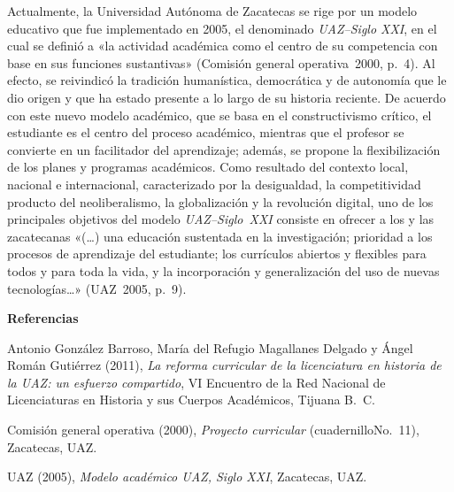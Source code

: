 Actualmente, la Universidad Autónoma de Zacatecas se rige por un modelo educativo que fue implementado en 2005, el de\-no\-mi\-na\-do {\textit{UAZ--Siglo XXI}}, en el cual se definió a «la actividad académica como el centro de su 
competencia con base en sus funciones sustantivas» (Comisión general 
operativa~2000, p.~4).  Al efecto, se reivindicó la tradición 
humanística, democrática y de autonomía que le dio origen y que ha 
estado presente a lo largo de su historia reciente. De acuerdo con este 
nuevo modelo académico, que se basa en el constructivismo crítico, el 
estudiante es el centro del proceso académico, mientras que el profesor 
se convierte en un facilitador del aprendizaje; además, se propone la 
flexibilización de los planes y programas académicos. Como resultado 
del contexto local, nacional e internacional, caracterizado por la 
desigualdad, la competitividad producto del neoliberalismo, la 
globalización y la revolución digital, uno de los principales objetivos 
del modelo \textit{UAZ--Siglo~XXI} consiste en ofrecer a los y las 
zacatecanas «(\ldots) una educación sustentada en la investigación; prioridad a 
los procesos de aprendizaje del estudiante; los currículos abiertos y 
flexibles para todos y para toda la vida, y la incorporación y 
generalización del uso de nuevas tecnologías\ldots» (UAZ~2005, p.~9).

\bigskip
\textbf{Referencias}

Antonio González Barroso, María del Refugio Magallanes Delgado y Ángel
Román Gutiérrez (2011), \textit{La reforma curricular de la licenciatura 
en historia de la UAZ: un esfuerzo compartido}, VI Encuentro de la Red Nacional de
Licenciaturas en Historia y sus Cuerpos Académicos, Tijuana B.\ C\@.

Comisión general operativa (2000), \textit{Proyecto curricular} (cuadernillo\linebreak No.~11), 
Zacatecas, UAZ.

UAZ (2005), \textit{Modelo académico UAZ, Siglo XXI}, Zacatecas, UAZ.
\newpage
\thispagestyle{empty}
\phantom{abc}
